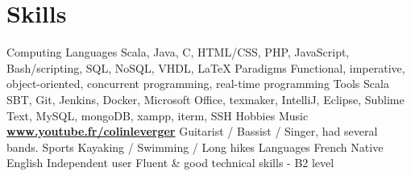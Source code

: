 \documentclass[]{friggeri-cv}
\begin{document}
\section{Skills}
\begin{entrylist}
  \entry
    {Computing}
    {Languages}
    {}
    {Scala, Java, C, HTML/CSS, PHP, JavaScript, Bash/scripting, SQL, NoSQL, VHDL, \LaTeX}
  \entry
    {}
    {Paradigms}
    {}
    {Functional, imperative, object-oriented, concurrent programming, real-time programming}
  \entry
    {}
    {Tools}
    {}
    {Scala SBT, Git, Jenkins, Docker, Microsoft Office, texmaker, IntelliJ, Eclipse, Sublime Text, MySQL, mongoDB, xampp, iterm, SSH}
  \entry
    {Hobbies}
    {Music}
    {\href{https://www.youtube.com/channel/UCPBCzj-0apmax9lFwj3qKhA}{\textbf{www.youtube.fr/colinleverger}}}
    {Guitarist / Bassist / Singer, had several bands.}
  \entry
    {}
    {Sports}
    {}
    {Kayaking / Swimming / Long hikes}
  \entry
    {Languages}
    {French}
    {}
    {Native}
  \entry
    {}
    {English}
    {Independent user}
    {Fluent \& good technical skills - B2 level}
\end{entrylist}
\end{document}
